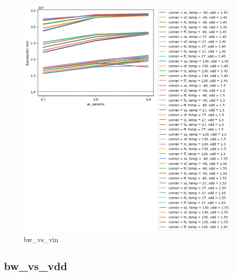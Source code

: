 \documentclass[
  a4paper,
  DIV=11,
  numbers=noendperiod]{scrartcl}
\begin{document}
\begin{tcolorbox}
\begin{figure}[H]
{\centering \includegraphics{./cace/_docs/ota-5t/schematic/bw_vs_vin.png}

}

\caption{bw\_vs\_vin}

\end{figure}%

\subsection{bw\_vs\_vdd}\label{bw_vs_vdd}

\begin{figure}[H]


\end{figure}
\end{tcolorbox}
\end{document}
